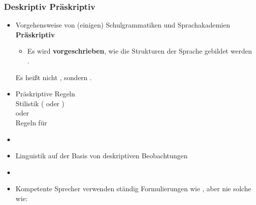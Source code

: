 
\begin{frame}
	\frametitle{Deskriptiv \vs Präskriptiv}
	
\begin{itemize}
	\item Vorgehensweise von (einigen) Schulgrammatiken und Sprachakademien \ras \textbf{Präskriptiv}
	\begin{itemize}
		\item Es wird \textbf{vorgeschrieben}, wie die Strukturen der Sprache gebildet werden .
	\end{itemize}	
		
	\ea Es heißt nicht , sondern .	
	\z
	
\end{itemize}

\end{frame}


\begin{frame}

\begin{itemize}
	\item Präskriptive Regeln \\
	\ras Stilistik ( oder )\\
	oder\\
	\ras Regeln für 
	\item[]
	\item Linguistik \ras auf der Basis von deskriptiven Beobachtungen
	\item[]
	\item Kompetente Sprecher verwenden ständig Formulierungen wie , aber nie solche wie:

	\z
	
	\z
	
	\z
	
\end{itemize}

\end{frame}


